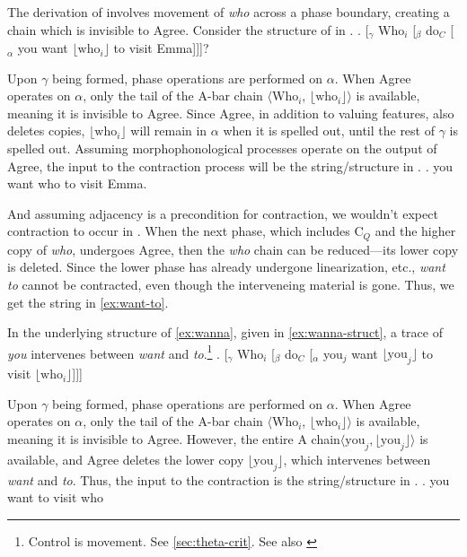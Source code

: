 \documentclass[MilwayThesis]{subfiles}
\begin{document}
The derivation of \Last[b] involves movement of \textit{who} across a phase boundary, creating a chain which is invisible to Agree.
Consider the structure of \Last[b] in \Next.
\ex. \label{fig:star-wanna-tree}
[$_\gamma$ Who$_i$ [$_\beta$ do$_C$ [$_\alpha$ you want $\lfloor\text{who}_{i}\rfloor$ to visit Emma]]]?

Upon $\gamma$ being formed, phase operations are performed on $\alpha$.
When Agree operates on $\alpha$, only the tail of the A-bar chain $\langle$Who$_i$, $\lfloor\text{who}_{i}\rfloor\rangle$ is available, meaning it is invisible to Agree.
Since Agree, in addition to valuing features, also deletes copies, $\lfloor\text{who}_{i}\rfloor$ will remain in $\alpha$ when it is spelled out, until the rest of $\gamma$ is spelled out.
Assuming morphophonological processes operate on the output of Agree, the input to the contraction process will be the string/structure in \Next.
\ex. you want who to visit Emma.

And assuming adjacency is a precondition for contraction, we wouldn't expect contraction to occur in \Last.
When the next phase, which includes C$_{Q}$ and the higher copy of \textit{who}, undergoes Agree, then the \textit{who} chain can be reduced---its lower copy is deleted.
Since the lower phase has already undergone linearization, etc., \textit{want to} cannot be contracted, even though the interveneing material is gone.
Thus, we get the string in \cref{ex:want-to}.

In the underlying structure of \cref{ex:wanna}, given in \cref{ex:wanna-struct}, a trace of \textit{you} intervenes between \textit{want} and \textit{to}.\footnote{
	Control is movement.
	See \cref{sec:theta-crit}.
	See also \textcite{hornstein1999movement}
}
\ex.\label{ex:wanna-struct} [$_{\gamma}$ Who$_{i}$ [$_{\beta}$ do$_{C}$ [$_{\alpha}$ you$_{j}$ want $\lfloor\text{you}_{j}\rfloor$ to visit $\lfloor\text{who}_{i}\rfloor$]]] 

Upon $\gamma$ being formed, phase operations are performed on $\alpha$.
When Agree operates on $\alpha$, only the tail of the A-bar chain $\langle$Who$_i$, $\lfloor\text{who}_{i}\rfloor\rangle$ is available, meaning it is invisible to Agree.
However, the entire A chain$\langle\text{you}_{j}, \lfloor\text{you}_{j}\rfloor\rangle$ is available, and Agree deletes the lower copy $\lfloor\text{you}_{j}\rfloor$, which intervenes between \textit{want} and \textit{to}.
Thus, the input to the contraction is the string/structure in \Next.
\ex. you want to visit who
\end{document}
